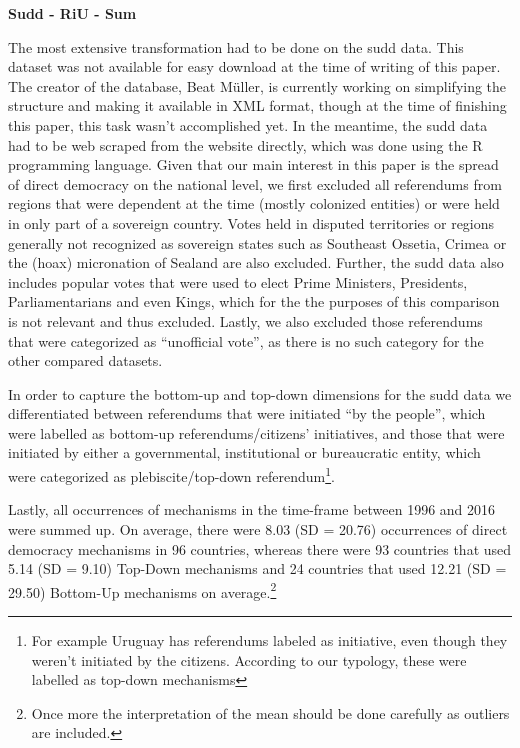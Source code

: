 \documentclass[]{article}
\let\rmarkdownfootnote\footnote%
\def\footnote{\protect\rmarkdownfootnote}
\begin{document}
\textbf{Sudd - RiU - Sum}

The most extensive transformation had to be done on the sudd data. This
dataset was not available for easy download at the time of writing of
this paper. The creator of the database, Beat Müller, is currently
working on simplifying the structure and making it available in XML
format, though at the time of finishing this paper, this task wasn't
accomplished yet. In the meantime, the sudd data had to be web scraped
from the website directly, which was done using the R programming
language. Given that our main interest in this paper is the spread of
direct democracy on the national level, we first excluded all
referendums from regions that were dependent at the time (mostly
colonized entities) or were held in only part of a sovereign country.
Votes held in disputed territories or regions generally not recognized
as sovereign states such as Southeast Ossetia, Crimea or the (hoax)
micronation of Sealand are also excluded. Further, the sudd data also
includes popular votes that were used to elect Prime Ministers,
Presidents, Parliamentarians and even Kings, which for the the purposes
of this comparison is not relevant and thus excluded. Lastly, we also
excluded those referendums that were categorized as ``unofficial vote'',
as there is no such category for the other compared datasets.

In order to capture the bottom-up and top-down dimensions for the sudd
data we differentiated between referendums that were initiated ``by the
people'', which were labelled as bottom-up referendums/citizens'
initiatives, and those that were initiated by either a governmental,
institutional or bureaucratic entity, which were categorized as
plebiscite/top-down referendum\footnote{For example Uruguay has
  referendums labeled as initiative, even though they weren't initiated
  by the citizens. According to our typology, these were labelled as
  top-down mechanisms}.

Lastly, all occurrences of mechanisms in the time-frame between 1996 and
2016 were summed up. On average, there were 8.03 (SD = 20.76)
occurrences of direct democracy mechanisms in 96 countries, whereas
there were 93 countries that used 5.14 (SD = 9.10) Top-Down mechanisms
and 24 countries that used 12.21 (SD = 29.50) Bottom-Up mechanisms on
average.\footnote{Once more the interpretation of the mean should be
  done carefully as outliers are included.}
\end{document}
